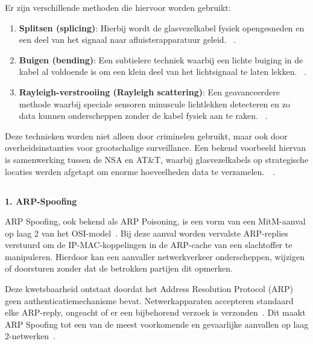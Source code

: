 Er zijn verschillende methoden die hiervoor worden gebruikt:
\begin{enumerate}
\item \textbf{Splitsen (splicing)}: Hierbij wordt de glasvezelkabel fysiek opengesneden en een deel van het signaal naar afluisterapparatuur geleid.​ ~\autocite{EVERETT2007}. 

\item \textbf{Buigen (bending)}: Een subtielere techniek waarbij een lichte buiging in de kabel al voldoende is om een klein deel van het lichtsignaal te laten lekken.​ ~\autocite{EVERETT2007}. 

 \item \textbf{Rayleigh-verstrooiing (Rayleigh scattering)}: Een geavanceerdere methode waarbij speciale sensoren minuscule lichtlekken detecteren en zo data kunnen onderscheppen zonder de kabel fysiek aan te raken.​ ~\autocite{EVERETT2007}. 
\end{enumerate} 
Deze technieken worden niet alleen door criminelen gebruikt, maar ook door overheidsinstanties voor grootschalige surveillance. Een bekend voorbeeld hiervan is samenwerking tussen de NSA en AT\&T, waarbij glasvezelkabels op strategische locaties werden afgetapt om enorme hoeveelheden data te verzamelen. ~\autocite{EVERETT2007}. 


\subsection{}
\label{sec:MitM-aanvallen-op-datalinklaag}

\vspace{0.5cm}
\textbf{1. ARP-Spoofing}


ARP Spoofing, ook bekend als ARP Poisoning, is een vorm van een MitM-aanval op laag 2 van het OSI-model~\autocite{ARSLAN2017}. 
Bij deze aanval worden vervalste ARP-replies verstuurd om de IP-MAC-koppelingen in de ARP-cache van een slachtoffer te manipuleren. Hierdoor kan een aanvaller netwerkverkeer onderscheppen, wijzigen of doorsturen zonder dat de betrokken partijen dit opmerken.

Deze kwetsbaarheid ontstaat doordat het Address Resolution Protocol (ARP) geen authenticatiemechanisme bevat. Netwerkapparaten accepteren standaard elke ARP-reply, ongeacht of er een bijbehorend verzoek is verzonden~\autocite{ARSLAN2017}. 
Dit maakt ARP Spoofing tot een van de meest voorkomende en gevaarlijke aanvallen op laag 2-netwerken~\autocite{ARSLAN2017}.

